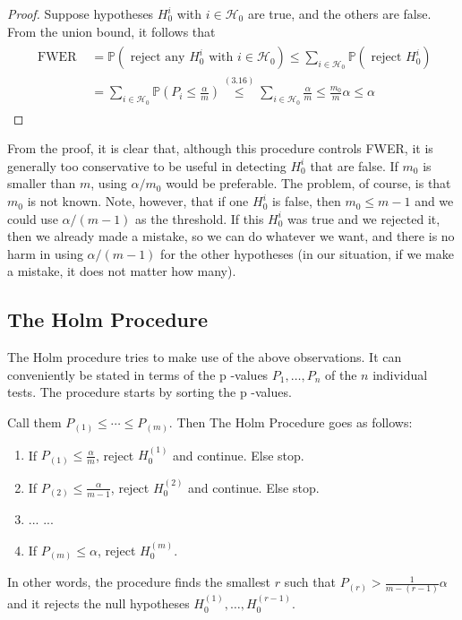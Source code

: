 \begin{proof}
    Suppose hypotheses $H_0^i$ with $i \in \mathcal{H}_0$ are true, and the others are false. From the union bound, it follows that
\begin{align*}
\begin{aligned}
\text { FWER } & =\mathbb{P}\left(\text { reject any } H_0^i \text { with } i \in \mathcal{H}_0\right) \leq \sum_{i \in \mathcal{H}_0} \mathbb{P}\left(\text { reject } H_0^i\right) \\
& =\sum_{i \in \mathcal{H}_0} \mathbb{P}\left(P_i \leq \frac{\alpha}{m}\right) \stackrel{(3.16)}{\leq} \sum_{i \in \mathcal{H}_0} \frac{\alpha}{m} \leq \frac{m_0}{m} \alpha \leq \alpha
\end{aligned}
\end{align*}
\end{proof}


\begin{remark}
    From the proof, it is clear that, although this procedure controls FWER, it is generally too conservative to be useful in detecting $H_0^i$ that are false. If $m_0$ is smaller than $m$, using $\alpha / m_0$ would be preferable. The problem, of course, is that $m_0$ is not known. Note, however, that if one $H_0^i$ is false, then $m_0 \leq m-1$ and we could use $\alpha /(m-1)$ as the threshold. If this $H_0^i$ was true and we rejected it, then we already made a mistake, so we can do whatever we want, and there is no harm in using $\alpha /(m-1)$ for the other hypotheses (in our situation, if we make a mistake, it does not matter how many).
\end{remark}

\subsection{The Holm Procedure}
The Holm procedure tries to make use of the above observations. It can conveniently be stated in terms of the p -values $P_1, \ldots, P_n$ of the $n$ individual tests. The procedure starts by sorting the p -values. 

\begin{de}
    Call them $P_{(1)} \leq \cdots \leq P_{(m)}$. Then The Holm Procedure goes as follows:
    \begin{enumerate}
        \item If $P_{(1)} \leq \frac{\alpha}{m}$, reject $H_0^{(1)}$ and continue. Else stop.
        \item If $P_{(2)} \leq \frac{\alpha}{m-1}$, reject $H_0^{(2)}$ and continue. Else stop.
        \item ... ...
        \item If $P_{(m)} \leq \alpha$, reject $H_0^{(m)}$.
    \end{enumerate}
In other words, the procedure finds the smallest $r$ such that $P_{(r)}> \frac{1}{m-(r-1)} \alpha$ and it rejects the null hypotheses $H_0^{(1)}, \ldots, H_0^{(r-1)}$.
\end{de}


